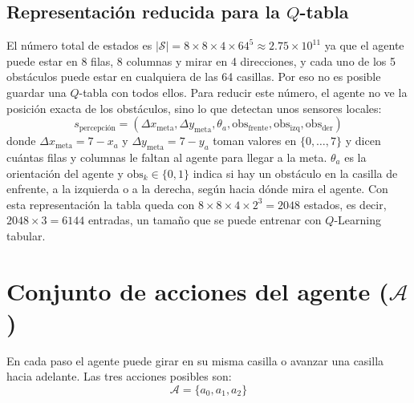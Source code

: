 \documentclass[11pt,a4paper]{article}
\begin{document}
\subsection{Representación reducida para la $Q$-tabla}
El número total de estados es $|\mathcal{S}| = 8 \times 8 \times 4 \times 64^5 \approx 2.75 \times 10^{11}$ ya que el agente puede estar en 8 filas, 8 columnas y mirar en 4 direcciones, y cada uno de los 5 obstáculos puede estar en cualquiera de las 64 casillas. Por eso no es posible guardar una $Q$-tabla con todos ellos. Para reducir este número, el agente no ve la posición exacta de los obstáculos, sino lo que detectan unos sensores locales:
\begin{equation}
    s_{\text{percepción}} = (\Delta x_{\text{meta}}, \Delta y_{\text{meta}}, \theta_a, \text{obs}_{\text{frente}}, \text{obs}_{\text{izq}}, \text{obs}_{\text{der}})
\end{equation}
donde $\Delta x_{\text{meta}} = 7 - x_a$ y $\Delta y_{\text{meta}} = 7 - y_a$ toman valores en $\{0, \dots, 7\}$ y dicen cuántas filas y columnas le faltan al agente para llegar a la meta. $\theta_a$ es la orientación del agente y $\text{obs}_k \in \{0, 1\}$ indica si hay un obstáculo en la casilla de enfrente, a la izquierda o a la derecha, según hacia dónde mira el agente. Con esta representación la tabla queda con $8 \times 8 \times 4 \times 2^3 = 2048$ estados, es decir, $2048 \times 3 = 6144$ entradas, un tamaño que se puede entrenar con $Q$-Learning tabular.

\section{Conjunto de acciones del agente ($\mathcal{A}$)}
En cada paso el agente puede girar en su misma casilla o avanzar una casilla hacia adelante. Las tres acciones posibles son:
\begin{equation}
    \mathcal{A} = \{a_0, a_1, a_2\}
\end{equation}
\end{document}

